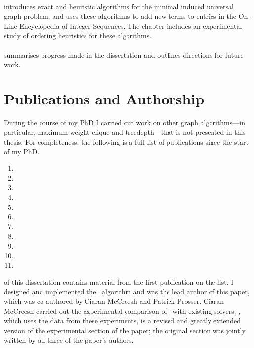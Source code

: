 \paragraph*{} introduces exact and heuristic
algorithms for the minimal induced universal graph problem, and uses these
algorithms to add new terms to entries in
the On-Line Encyclopedia of Integer Sequences.  The chapter includes
an experimental study of ordering heuristics for these algorithms.

\paragraph*{} summarises progress made in the dissertation
and outlines directions for future work.

\section{Publications and Authorship}

During the course of my PhD I carried out work on other graph algorithms---in particular,
maximum weight clique and treedepth---that is not presented in this thesis.
For completeness, the following is a full list of publications
since the start of my PhD.

\begin{enumerate}
    \item{}
    \item{}
    \item{}
    \item{}
    \item{}
    \item{}
    \item{}
    \item{}
    \item{}
    \item{}
    \item{}
\end{enumerate}

 of this dissertation contains material from the
first publication on the list.  I designed and implemented the \McSplit\
algorithm and was the lead author of this paper, which was
co-authored by Ciaran McCreesh and Patrick Prosser.
Ciaran McCreesh carried out the experimental comparison of \McSplit\ with
existing solvers.  \Cref{sec:mcsplit-experiments}, which uses the data from these
experiments, is a revised and greatly extended version of the experimental
section of the paper; the original section was jointly written by all three
of the paper's authors.

